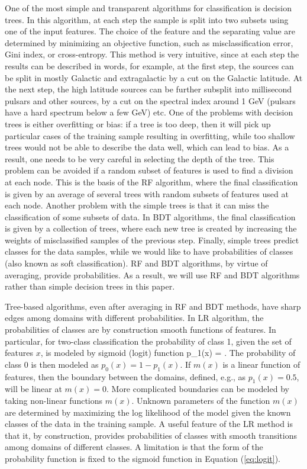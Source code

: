 One of the most simple and transparent algorithms for classification is decision trees.
In this algorithm, at each step the sample is split into two subsets using one of the input features.
The choice of the feature and the separating value are determined by minimizing an objective function, such as misclassification
error, Gini index, or cross-entropy.
This method is very intuitive, since at each step the results can be described in words, 
for example, at the first step, the sources can be split in mostly Galactic and extragalactic by a cut on the Galactic latitude.
At the next step, the high latitude sources can be further subsplit into millisecond pulsars and other sources, by a cut on the spectral index around 1 GeV (pulsars have a hard spectrum below a few GeV) etc.
One of the problems with decision trees is either overfitting or bias: if a tree is too deep, then it will pick up particular cases of the training sample resulting in overfitting, while too shallow trees would not be able to describe the data well, which can lead to bias. 
As a result, one needs to be very careful in selecting the depth of the tree.
This problem can be avoided if a random subset of features is used to find a division at each node. This is the basis of the RF algorithm,
where the final classification is given by an average of several trees with random subsets of features used at each node.
Another problem with the simple trees is that it can miss the classification of some subsets of data. In BDT algorithms, the final classification is given by a collection of trees, where each new tree is created by increasing the weights of misclassified samples of the previous step. 
Finally, simple trees predict classes for the data samples, while we would like to have probabilities of classes (also known as soft classification).
RF and BDT algorithms, by virtue of averaging, provide probabilities. As a result, we will use RF and BDT algorithms rather than simple decision trees in this paper.

Tree-based algorithms, even after averaging in RF and BDT methods, have sharp edges among domains with different probabilities.
In LR algorithm, the probabilities of classes are by construction smooth functions of features.
In particular, for two-class classification the probability of class 1, given the set of features $x$, is modeled by sigmoid (logit) function
\be
{}
p_1(x) = .
\ee
The probability of class 0 is then modeled as $p_0(x) = 1 - p_1(x)$.
If $m(x)$ is a linear function of features, then the boundary between the domains, defined, e.g., as $p_1(x) = 0.5$, will be linear
at $m(x) = 0$.
More complicated boundaries can be modeled by taking non-linear functions $m(x)$.
Unknown parameters of the function $m(x)$ are determined by maximizing the log likelihood of the model given the known classes of the data in the training sample.
A useful feature of the LR method is that it, by construction, provides probabilities of classes with smooth transitions among domains of different classes.
A limitation is that the form of the probability function is fixed to the sigmoid function in Equation (\ref{eq:logit}).

